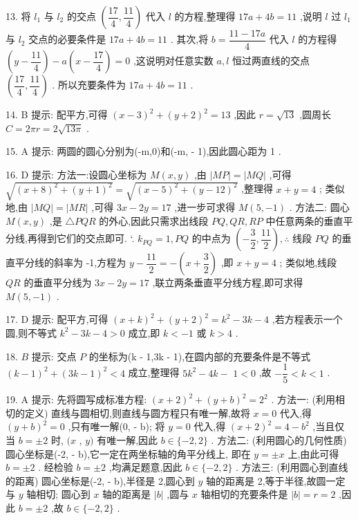13. 将 ${l}_{1}$ 与 ${l}_{2}$ 的交点 $\left( {\dfrac{17}{4},\dfrac{11}{4}}\right)$ 代入 $l$ 的方程,整理得 ${17a} + {4b} = {11}$ ,说明 $l$ 过 ${l}_{1}$ 与 ${l}_{2}$ 交点的必要条件是 ${17a} + {4b} = {11}$ . 其次,将 $b = \dfrac{{11} - {17a}}{4}$ 代入 $l$ 的方程得 $\left( {y - \dfrac{11}{4}}\right)  - a\left( {x - \dfrac{17}{4}}\right)  = 0$ ,这说明对任意实数 $a,l$ 恒过两直线的交点 $\left( {\dfrac{17}{4},\dfrac{11}{4}}\right)$ . 所以充要条件为 ${17a} + {4b} = {11}$ .

14. B 提示: 配平方,可得 ${\left( x - 3\right) }^{2} + {\left( y + 2\right) }^{2} = {13}$ ,因此 $r = \sqrt{13}$ ,圆周长 $C = {2\pi r} = 2\sqrt{13\pi }$ .

15. A 提示: 两圆的圆心分别为(-m,0)和(-m, - 1),因此圆心距为 1 .

16. D 提示: 方法一:设圆心坐标为 $M\left( {x,y}\right)$ ,由 $\left| {MP}\right|  = \left| {MQ}\right|$ ,可得 $\sqrt{{\left( x + 8\right) }^{2} + {\left( y + 1\right) }^{2}} = \sqrt{{\left( x - 5\right) }^{2} + {\left( y - {12}\right) }^{2}}$ ,整理得 $x + y = 4$ ; 类似地,由 $\left| {MQ}\right|  = \left| {MR}\right|$ ,可得 ${3x} - {2y} = {17}$ ,进一步可求得 $M\left( {5, - 1}\right)$ . 方法二: 圆心 $M\left( {x,y}\right)$ ,是 $\bigtriangleup {PQR}$ 的外心,因此只需求出线段 ${PQ},{QR},{RP}$ 中任意两条的垂直平分线,再得到它们的交点即可. ‘. ${k}_{PQ} = 1,{PQ}$ 的中点为 $\left( {-\dfrac{3}{2},\dfrac{11}{2}}\right) ,\therefore$ 线段 ${PQ}$ 的垂直平分线的斜率为 -1,方程为 $y - \dfrac{11}{2} =  - \left( {x + \dfrac{3}{2}}\right)$ ,即 $x + y = 4$ ; 类似地,线段 ${QR}$ 的垂直平分线为 ${3x} - {2y} = {17}$ ,联立两条垂直平分线方程,即可求得 $M\left( {5, - 1}\right)$ .

17. D 提示: 配平方,可得 ${\left( x + k\right) }^{2} + {\left( y + 2\right) }^{2} = {k}^{2} - {3k} - 4$ ,若方程表示一个圆,则不等式 ${k}^{2} - {3k} - 4 > 0$ 成立,即 $k <  - 1$ 或 $k > 4$ .

18. $B$ 提示: 交点 $P$ 的坐标为(k - 1,3k - 1),在圆内部的充要条件是不等式 ${\left( k - 1\right) }^{2} + {\left( 3k - 1\right) }^{2} < 4$ 成立,整理得 $5{k}^{2} - {4k} -$  $1 < 0$ ,故 $- \dfrac{1}{5} < k < 1$ .

19. A 提示: 先将圆写成标准方程: ${\left( x + 2\right) }^{2} + {\left( y + b\right) }^{2} = {2}^{2}$ . 方法一: (利用相切的定义) 直线与圆相切,则直线与圆方程只有唯一解,故将 $x = 0$ 代入,得 ${\left( y + b\right) }^{2} = 0$ ,只有唯一解(0, - b); 将 $y = 0$ 代入,得 ${\left( x + 2\right) }^{2} = 4 - {b}^{2}$ ,当且仅当 $b =  \pm  2$ 时, $(x$ , $y)$ 有唯一解,因此 $b \in  \{  - 2,2\}$ . 方法二: (利用圆心的几何性质) 圆心坐标是(-2, - b),它一定在两坐标轴的角平分线上, 即在 $y =  \pm  x$ 上,由此可得 $b =  \pm  2$ . 经检验 $b =  \pm  2$ ,均满足题意,因此 $b \in  \{  - 2,2\}$ . 方法三: (利用圆心到直线的距离) 圆心坐标是(-2, - b),半径是 2,圆心到 $y$ 轴的距离是 2,等于半径,故圆一定与 $y$ 轴相切; 圆心到 $x$ 轴的距离是 $\left| b\right|$ ,圆与 $x$ 轴相切的充要条件是 $\left| b\right|  = r = 2$ ,因此 $b =  \pm  2$ ,故 $b \in  \{  - 2,2\}$ .

